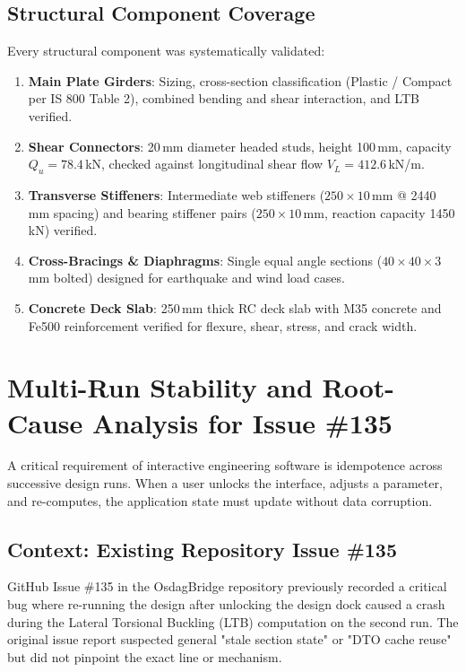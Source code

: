 \documentclass[11pt,a4paper]{article}
\begin{document}
\subsection{Structural Component Coverage}
Every structural component was systematically validated:
\begin{enumerate}
    \item \textbf{Main Plate Girders}: Sizing, cross-section classification (Plastic / Compact per IS 800 Table 2), combined bending and shear interaction, and LTB verified.
    \item \textbf{Shear Connectors}: 20\,mm diameter headed studs, height 100\,mm, capacity $Q_u = 78.4$\,kN, checked against longitudinal shear flow $V_L = 412.6$\,kN/m.
    \item \textbf{Transverse Stiffeners}: Intermediate web stiffeners ($250 \times 10$\,mm @ 2440\,mm spacing) and bearing stiffener pairs ($250 \times 10$\,mm, reaction capacity 1450\,kN) verified.
    \item \textbf{Cross-Bracings \& Diaphragms}: Single equal angle sections ($40 \times 40 \times 3$\,mm bolted) designed for earthquake and wind load cases.
    \item \textbf{Concrete Deck Slab}: 250\,mm thick RC deck slab with M35 concrete and Fe500 reinforcement verified for flexure, shear, stress, and crack width.
\end{enumerate}

\section{Multi-Run Stability and Root-Cause Analysis for Issue \#135}

A critical requirement of interactive engineering software is idempotence across successive design runs. When a user unlocks the interface, adjusts a parameter, and re-computes, the application state must update without data corruption.

\subsection{Context: Existing Repository Issue \#135}
GitHub Issue \#135 in the OsdagBridge repository previously recorded a critical bug where re-running the design after unlocking the design dock caused a crash during the Lateral Torsional Buckling (LTB) computation on the second run. The original issue report suspected general "stale section state" or "DTO cache reuse" but did not pinpoint the exact line or mechanism.
\end{document}
